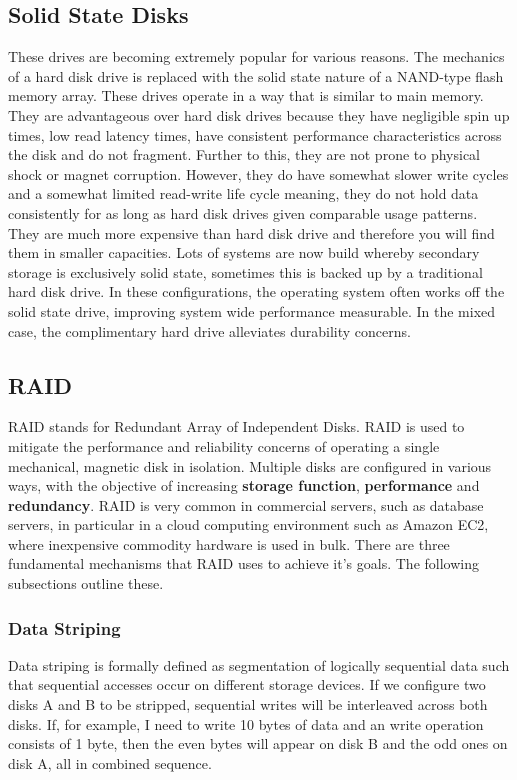 \documentclass[10pt,a4paper]{article}
\begin{document}
\subsection{Solid State Disks}
These drives are becoming extremely popular for various reasons. The mechanics of a hard disk drive is replaced with the solid state nature of a NAND-type flash memory array. These drives operate in a way that is similar to main memory. They are advantageous over hard disk drives because they have negligible spin up times, low read latency times, have consistent performance characteristics across the disk and do not fragment. Further to this, they are not prone to physical shock or magnet corruption. However, they do have somewhat slower write cycles and a somewhat limited read-write life cycle meaning, they do not hold data consistently for as long as hard disk drives given comparable usage patterns. They are much more expensive than hard disk drive and therefore you will find them in smaller capacities. Lots of systems are now build whereby secondary storage is exclusively solid state, sometimes this is backed up by a traditional hard disk drive. In these configurations, the operating system often works off the solid state drive, improving system wide performance measurable. In the mixed case, the complimentary hard drive alleviates durability concerns. 
\subsection{RAID} 
RAID stands for Redundant Array of Independent Disks. RAID is used to mitigate the performance and reliability concerns of operating a single mechanical, magnetic disk in isolation. Multiple disks are configured in various ways, with the objective of increasing {\bf storage function}, {\bf performance} and {\bf redundancy}. RAID is very common in commercial servers, such as database servers, in particular in a cloud computing environment such as Amazon EC2, where inexpensive commodity hardware is used in bulk. There are three fundamental mechanisms that RAID uses to achieve it's goals. The following subsections outline these. 
\subsubsection{Data Striping}
Data striping is formally defined as segmentation of logically sequential data such that sequential accesses occur on different storage devices. If we configure two disks A and B to be stripped, sequential writes will be interleaved across both disks. If, for example, I need to write 10 bytes of data and an write operation consists of 1 byte, then the even bytes will appear on disk B and the odd ones on disk A, all in combined sequence. 
\end{document}
